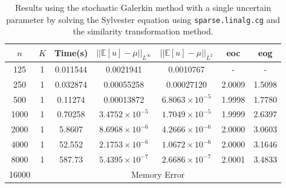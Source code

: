 \documentclass[11pt]{article}
\numberwithin{equation}{section}
\begin{document}
\begin{table}[H]
\centering
\begin{tabular}{|c|c|c|c|c|c|c|}
\hline
$n$ & $K$ & Time(s) & $|| \mathbb{E}[u] - \mu ||_{L^{\infty}}$ & $|| \mathbb{E}[u] - \mu ||_{L^{2}}$ & eoc & eog \\
\hline
125 & 1 & 0.011544 & 0.0021941 & 0.0010767 & - & - \\
250 & 1 & 0.032874 & 0.00055258 &  0.00027120 & 2.0009 & 1.5098 \\
500 & 1 & 0.11274 & 0.00013872 & $6.8063 \times 10^{-5}$ & 1.9998 & 1.7780 \\
1000 & 1 &  0.70258 & $3.4752 \times 10^{-5}$ & $1.7049 \times 10^{-5}$ & 1.9999 & 2.6397 \\
2000 & 1 & 5.8607 & $8.6968 \times 10^{-6}$ & $4.2666 \times 10^{-6}$ & 2.0000 & 3.0603 \\
4000 & 1 & 52.552 & $2.1753 \times 10^{-6}$ & $1.0672 \times 10^{-6}$ & 2.0000 & 3.1646 \\
8000 & 1 & 587.73 & $5.4395 \times 10^{-7}$ & $2.6686 \times 10^{-7}$ & 2.0001 & 3.4833 \\
\cline{2-7}
16000 & \multicolumn{6}{c|}{Memory Error} \\
\hline
\end{tabular}
\captionsetup{justification=centering}
\caption{Results using the stochastic Galerkin method with a single uncertain parameter by solving the Sylvester equation using \texttt{sparse.linalg.cg} and the similarity transformation method.}
\label{table:stochastic sylvester}
\end{table}

\newpage
\end{document}

